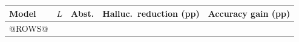 \begin{tabular}{lcccc}
\toprule
Model & $L$ & Abst. & Halluc.\ reduction (pp) & Accuracy gain (pp)\\
\midrule
@ROWS@
\bottomrule
\end{tabular}
